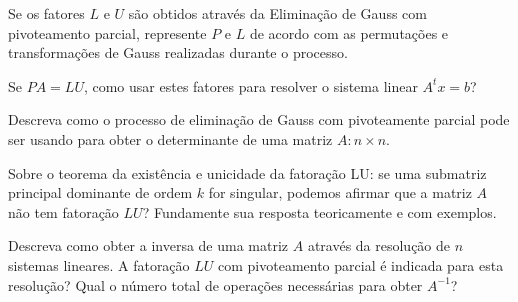 \documentclass[a4paper,12pt, leqno, answers]{exam}
\begin{document}
\begin{questions}

    \question Se os fatores $L$ e $U$ s\~{a}o obtidos atrav\'{e}s da Elimina\c{c}\~{a}o de Gauss com pivoteamento parcial, represente $P$ e $L$ de acordo com as permuta\c{c}\~{o}es e transforma\c{c}\~{o}es de Gauss realizadas durante o processo.
    \begin{solution}
        
    \end{solution}

    \question Se $P A = LU$, como usar estes fatores para resolver o sistema linear $A^t x = b$?
    \begin{solution}
        
    \end{solution}

    \question Descreva como o processo de elimina\c{c}\~{a}o de Gauss com pivoteamente parcial pode ser usando para obter o determinante de uma matriz $A : n \times n$.
    \begin{solution}
        
    \end{solution}

    \question Sobre o teorema da exist\^{e}ncia e unicidade da fatora\c{c}\~{a}o LU: se uma submatriz principal dominante de ordem $k$ for singular, podemos afirmar que a matriz $A$ n\~{a}o tem fatora\c{c}\~{a}o $LU$? Fundamente sua resposta teoricamente e com exemplos.
    \begin{solution}
        
    \end{solution}

    \question Descreva como obter a inversa de uma matriz $A$ atrav\'{e}s da resolu\c{c}\~{a}o de $n$ sistemas lineares. A fatora\c{c}\~{a}o $LU$ com pivoteamento parcial \'{e} indicada para esta resolu\c{c}\~{a}o? Qual o número total de opera\c{c}\~{o}es necess\'{a}rias para obter $A^{-1}$?
    \begin{solution}
        

\end{solution}
\end{questions}
\end{document}
